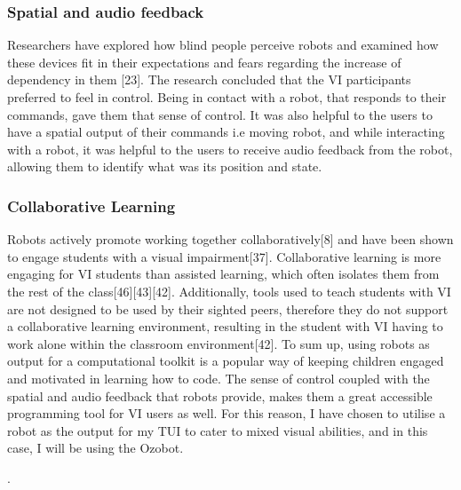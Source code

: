 \documentclass[oneside,%
                    author={Malak Hajji},
                    degree={BSc},
                    title={Designing An Accessible Computational Toolkit For Students},
                  subtitle={With Mixed Visual Abilities}]{dissertation}
\begin{document}
\subsubsection{Spatial and audio feedback}
Researchers have explored how blind people perceive robots and examined how these devices fit in their expectations and fears regarding the increase of dependency in them [23]. The research concluded that the VI participants preferred to feel in control. Being in contact with a robot, that responds to their commands, gave them that sense of control. It was also helpful to the users to have a spatial output of their commands i.e moving robot, and while interacting with a robot, it was helpful to the users to receive audio feedback from the robot, allowing them to identify what was its position and state. 

\subsubsection{Collaborative Learning}
Robots actively promote working together collaboratively[8] and have been shown to engage students with a visual impairment[37]. Collaborative learning is more engaging for VI students than assisted learning, which often isolates them from the rest of the class[46][43][42]. Additionally, tools used to teach students with VI are not designed to be used by their sighted peers, therefore they do not support a collaborative learning environment, resulting in the student with VI having to work alone within the classroom environment[42].
\newline
To sum up, using robots as output for a computational toolkit is a popular way of keeping children engaged and motivated in learning how to code. The sense of control coupled with the spatial and audio feedback that robots provide, makes them a great accessible programming tool for VI users as well. For this reason, I have chosen to utilise a robot as the output for my TUI to cater to mixed visual abilities, and in this case, I will be using the Ozobot.

.
\end{document}
